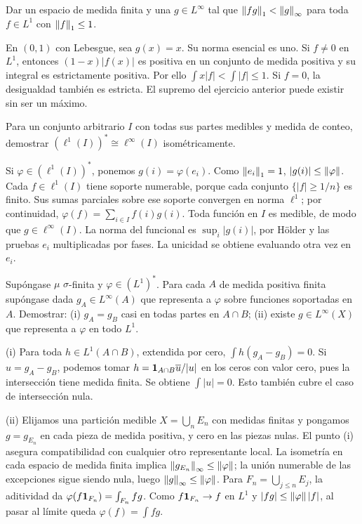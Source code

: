 \begin{ejercicio}\label{ej:v2-l23-4}
Dar un espacio de medida finita y una $g\in L^\infty$ tal que $\left\lVert fg\right\rVert_1<\left\lVert g\right\rVert_\infty$ para toda $f\in L^1$ con $\left\lVert f\right\rVert_1\le1$.
\end{ejercicio}
\begin{solucion}
En $(0,1)$ con Lebesgue, sea $g(x)=x$. Su norma esencial es uno. Si $f\ne0$ en $L^1$, entonces $(1-x)|f(x)|$ es positiva en un conjunto de medida positiva y su integral es estrictamente positiva. Por ello $\int x|f|<\int|f|\le1$. Si $f=0$, la desigualdad también es estricta. El supremo del ejercicio anterior puede existir sin ser un máximo.
\end{solucion}

\begin{ejercicio}\label{ej:v2-l23-5}
Para un conjunto arbitrario $I$ con todas sus partes medibles y medida de conteo, demostrar $(\ell^1(I))^*\cong\ell^\infty(I)$ isométricamente.
\end{ejercicio}
\begin{solucion}
Si $\varphi\in(\ell^1(I))^*$, ponemos $g(i)=\varphi(e_i)$. Como $\left\lVert e_i\right\rVert_1=1$, $|g(i)|\le\left\lVert\varphi\right\rVert$. Cada $f\in\ell^1(I)$ tiene soporte numerable, porque cada conjunto $\{|f|\ge1/n\}$ es finito. Sus sumas parciales sobre ese soporte convergen en norma $\ell^1$; por continuidad,
$\varphi(f)=\sum_{i\in I}f(i)g(i)$. Toda función en $I$ es medible, de modo que $g\in\ell^\infty(I)$. La norma del funcional es $\sup_i|g(i)|$, por Hölder y las pruebas $e_i$ multiplicadas por fases. La unicidad se obtiene evaluando otra vez en $e_i$.
\end{solucion}

\begin{ejercicio}\label{ej:v2-l23-6}
Supóngase $\mu$ $\sigma$-finita y $\varphi\in(L^1)^*$. Para cada $A$ de medida positiva finita supóngase dada $g_A\in L^\infty(A)$ que representa a $\varphi$ sobre funciones soportadas en $A$. Demostrar: (i) $g_A=g_B$ casi en todas partes en $A\cap B$; (ii) existe $g\in L^\infty(X)$ que representa a $\varphi$ en todo $L^1$.
\end{ejercicio}
\begin{solucion}
(i) Para toda $h\in L^1(A\cap B)$, extendida por cero, $\int h(g_A-g_B)=0$. Si $u=g_A-g_B$, podemos tomar $h=\mathbf1_{A\cap B}\overline u/|u|$ en los ceros con valor cero, pues la intersección tiene medida finita. Se obtiene $\int|u|=0$. Esto también cubre el caso de intersección nula.

(ii) Elijamos una partición medible $X=\bigcup_n E_n$ con medidas finitas y pongamos $g=g_{E_n}$ en cada pieza de medida positiva, y cero en las piezas nulas. El punto (i) asegura compatibilidad con cualquier otro representante local. La isometría en cada espacio de medida finita implica $\left\lVert g_{E_n}\right\rVert_\infty\le\left\lVert\varphi\right\rVert$; la unión numerable de las excepciones sigue siendo nula, luego $\left\lVert g\right\rVert_\infty\le\left\lVert\varphi\right\rVert$. Para $F_n=\bigcup_{j\le n}E_j$, la aditividad da $\varphi(f\mathbf1_{F_n})=\int_{F_n}fg$. Como $f\mathbf1_{F_n}\to f$ en $L^1$ y $|fg|\le\left\lVert\varphi\right\rVert|f|$, al pasar al límite queda $\varphi(f)=\int fg$.
\end{solucion}

